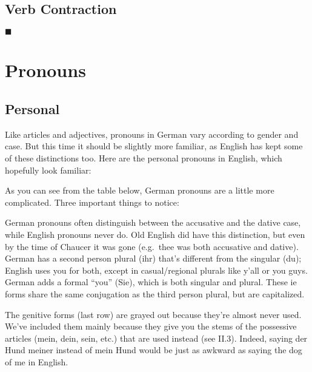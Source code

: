 \documentclass[a4paper,twocolumn,10pt]{article}
\newcommand{\sectionend}
{
\nolinenumbers
\begin{center}
	$\blacksquare$
\end{center}
\clearpage
\linenumbers
}
\newcommand{\subsectionend}
{
\nolinenumbers
\linenumbers
}
\begin{document}
\subsectionend


\subsection{Verb Contraction}
\label{ssec:verb_contraction}


\subsectionend

\sectionend

\section{{Pronouns}}
\label{sec:pronouns}

\subsection{Personal}
\label{ssec:personal}

Like articles and adjectives, pronouns in German vary according to gender and
case. But this time it should be slightly more familiar, as English has kept
some of these distinctions too. Here are the personal pronouns in English, which
hopefully look familiar:

As you can see from the table below, German pronouns are a little more
complicated. Three important things to notice:

    German pronouns often distinguish between the accusative and the dative
	case, while English pronouns never do. Old English did have this
	distinction, but even by the time of Chaucer it was gone (e.g.\ thee was both
	accusative and dative).
	    German has a second person plural (ihr) that’s different from the
		singular (du); English uses you for both, except in casual/regional
		plurals like y’all or you guys.
		    German adds a formal “you” (Sie), which is both singular and plural.
			These ie forms share the same conjugation as the third person
			plural, but are capitalized.

The genitive forms (last row) are grayed out because they're almost never used.
We've included them mainly because they give you the stems of the possessive
articles (mein, dein, sein, etc.) that are used instead (see II.3). Indeed,
saying der Hund meiner instead of mein Hund would be just as awkward as
saying the dog of me in English.
\end{document}
